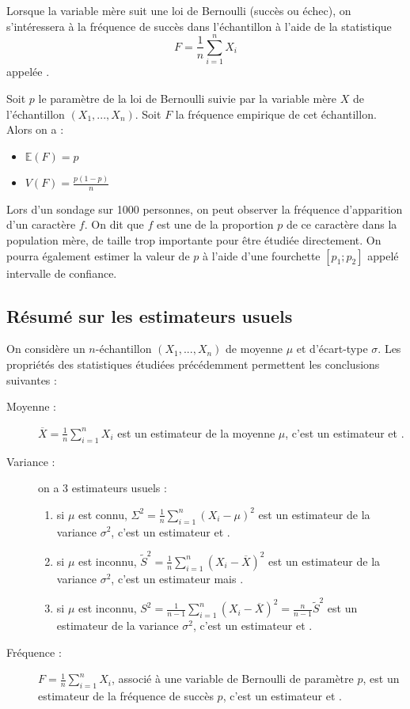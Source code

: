 Lorsque la variable mère suit une loi de Bernoulli (succès ou échec), on s'intéressera à la fréquence de succès dans l'échantillon à l'aide de la statistique 
$$F=\frac{1}{n}\sum_{i=1}^n X_i$$
appelée .

\begin{proposition}{}{}
  Soit $p$ le paramètre de la loi de Bernoulli suivie par la variable mère $X$ de l'échantillon $(X_1,...,X_n)$. Soit $F$ la fréquence empirique de cet échantillon. Alors on a :
 \begin{itemize}
  \item $\mathbb{E}(F)=p$
  \item $V(F) = \frac{p(1-p)}{n}$
 \end{itemize}
\end{proposition}




Lors d'un sondage sur 1000 personnes, on peut observer la fréquence d'apparition d'un caractère $f$. On dit que $f$ est une  de la proportion $p$ de ce caractère dans la population mère, de taille trop importante pour être étudiée directement. On pourra également estimer la valeur de $p$ à l'aide d'une fourchette $[p_1;p_2]$ appelé intervalle de confiance.

\subsection{Résumé sur les estimateurs usuels}
On considère un $n$-échantillon $(X_1,...,X_n)$ de moyenne $\mu$ et d'écart-type $\sigma$. Les propriétés des statistiques étudiées précédemment permettent les conclusions suivantes :

\begin{description}
 \item[Moyenne :] $\overline{X}=\frac{1}{n}\sum_{i=1}^n X_i$ est un estimateur de la moyenne $\mu$, c'est un estimateur  et .
 \item[Variance :] on a 3 estimateurs usuels :
 \begin{enumerate}
  \item si $\mu$ est connu, $\Sigma^2=\frac{1}{n}\sum_{i=1}^n (X_i-\mu)^2$ est un estimateur de la variance $\sigma^2$, c'est un estimateur  et .
  \item si $\mu$ est inconnu, $\tilde{S}^2=\frac{1}{n}\sum_{i=1}^n (X_i-\overline{X})^2$ est un estimateur de la variance $\sigma^2$, c'est un estimateur  mais .
  \item si $\mu$ est inconnu, $S^2=\frac{1}{n-1}\sum_{i=1}^n (X_i-\overline{X})^2 = \frac{n}{n-1}\tilde{S}^2$ est un estimateur de la variance $\sigma^2$, c'est un estimateur  et .
 \end{enumerate}
  \item[Fréquence :]  $F=\frac{1}{n}\sum_{i=1}^n X_i$, associé à une variable de Bernoulli de paramètre $p$, 
 est un estimateur de la fréquence de succès $p$, c'est un estimateur  et .
\end{description}
